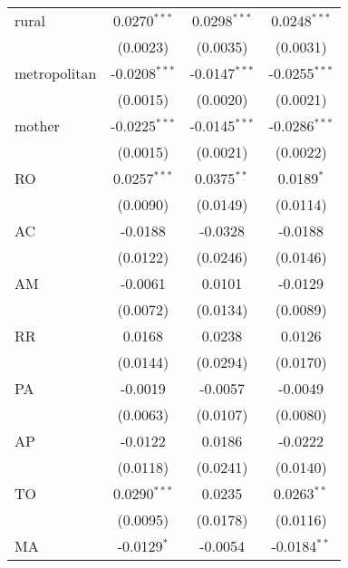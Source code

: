 \begin{tabular}{lccc}
   rural           & 0.0270$^{***}$          & 0.0298$^{***}$          & 0.0248$^{***}$\\   
                   & (0.0023)                & (0.0035)                & (0.0031)\\   
   metropolitan    & -0.0208$^{***}$         & -0.0147$^{***}$         & -0.0255$^{***}$\\   
                   & (0.0015)                & (0.0020)                & (0.0021)\\   
   mother          & -0.0225$^{***}$         & -0.0145$^{***}$         & -0.0286$^{***}$\\   
                   & (0.0015)                & (0.0021)                & (0.0022)\\   
   RO              & 0.0257$^{***}$          & 0.0375$^{**}$           & 0.0189$^{*}$\\   
                   & (0.0090)                & (0.0149)                & (0.0114)\\   
   AC              & -0.0188                 & -0.0328                 & -0.0188\\   
                   & (0.0122)                & (0.0246)                & (0.0146)\\   
   AM              & -0.0061                 & 0.0101                  & -0.0129\\   
                   & (0.0072)                & (0.0134)                & (0.0089)\\   
   RR              & 0.0168                  & 0.0238                  & 0.0126\\   
                   & (0.0144)                & (0.0294)                & (0.0170)\\   
   PA              & -0.0019                 & -0.0057                 & -0.0049\\   
                   & (0.0063)                & (0.0107)                & (0.0080)\\   
   AP              & -0.0122                 & 0.0186                  & -0.0222\\   
                   & (0.0118)                & (0.0241)                & (0.0140)\\   
   TO              & 0.0290$^{***}$          & 0.0235                  & 0.0263$^{**}$\\   
                   & (0.0095)                & (0.0178)                & (0.0116)\\   
   MA              & -0.0129$^{*}$           & -0.0054                 & -0.0184$^{**}$\\   

\end{tabular}
